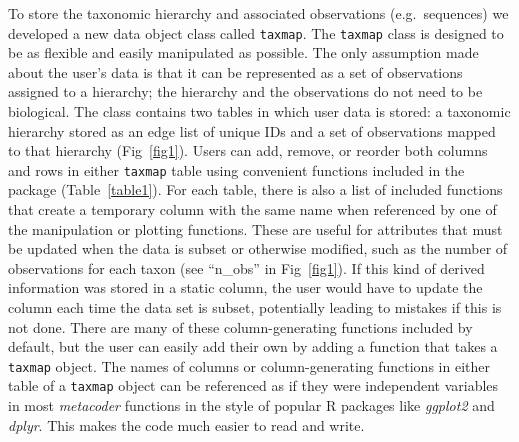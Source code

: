 \documentclass[10pt,letterpaper]{article}
\begin{document}
To store the taxonomic hierarchy and associated observations
(e.g.~sequences) we developed a new data object class called
\texttt{taxmap}. The \texttt{taxmap} class is designed to be as flexible
and easily manipulated as possible. The only assumption made about the
user's data is that it can be represented as a set of observations
assigned to a hierarchy; the hierarchy and the observations do not need
to be biological. The class contains two tables in which user data is
stored: a taxonomic hierarchy stored as an edge list of unique IDs and a
set of observations mapped to that hierarchy (Fig~\ref{fig1}). Users can add,
remove, or reorder both columns and rows in either \texttt{taxmap} table
using convenient functions included in the package (Table~\ref{table1}). For each
table, there is also a list of included functions that create a
temporary column with the same name when referenced by one of the
manipulation or plotting functions. These are useful for attributes that
must be updated when the data is subset or otherwise modified, such as
the number of observations for each taxon (see ``n\_obs'' in Fig~\ref{fig1}).
If this kind of derived information was stored in a static column, the
user would have to update the column each time the data set is subset,
potentially leading to mistakes if this is not done. There are many of
these column-generating functions included by default, but the user can
easily add their own by adding a function that takes a \texttt{taxmap}
object. The names of columns or column-generating functions in either
table of a \texttt{taxmap} object can be referenced as if they were
independent variables in most \emph{metacoder} functions in the style of
popular R packages like \emph{ggplot2} and \emph{dplyr}. This makes the
code much easier to read and write.
\end{document}
